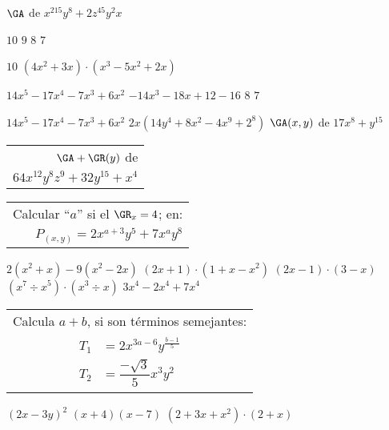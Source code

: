 $\GA$ de $x^215y^8+2z^45y^2x$
\begin{enum}
	\ii $10$
	\ii $9$
	\ii $8$
	\ii $7$
\end{enum}
$10$
$\left(4x^2+3x\right)\cdot\left(x^3-5x^2+2x\right)$
\begin{enum}
	\ii $14x^5-17x^4-7x^3+6x^2$
	\ii $-14x^3-18x+12-16$
	\ii $8$
	\ii $7$
\end{enum}
$14x^5-17x^4-7x^3+6x^2$
$2x\left(14y^4+8x^2-4x^9+2^8\right)$
$\GA(x,y)$ de $17x^8+y^{15}$
\begin{tabular}{r}
	$\GA+\GR(y)$ de \\
	$64x^{12}y^8z^9+32y^{15}+x^4$
\end{tabular}
\begin{tabular}{r}
	Calcular ``$a$'' si el $\GR_x=4$; en: \\
	$P_{(x,y)}=2x^{a+3}y^5+7x^ay^8$
\end{tabular}
$2\left(x^2+x\right)-9\left(x^2-2x\right)$
$(2x+1)\cdot\left(1+x-x^2\right)$
$(2x-1)\cdot(3-x)$
$\left(x^7\div x^5\right)\cdot\left(x^3\div x\right)$
$3x^4-2x^4+7x^4$
\begin{tabular}{c}
	Calcula $a+b$, si son t\'erminos semejantes: \\
	$\begin{aligned}
		T_1&=2x^{3a-6}y^{\frac{b-1}{5}} \\

		T_2&=\dfrac{-\sqrt{3}}{5}x^3y^2
	\end{aligned}$
\end{tabular}
$(2x-3y)^2$
$(x+4)(x-7)$
$\left(2+3x+x^2\right)\cdot(2+x)$

